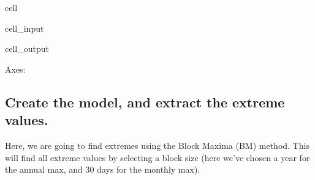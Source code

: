 \documentclass[letterpaper,10pt,english]{jupyterBook}
\begin{document}
\begin{sphinxuseclass}{cell}
\begin{sphinxVerbatimInput}
\begin{sphinxuseclass}{cell_input}
\begin{sphinxVerbatim}[commandchars=\\\{\}]
  
  

    

 
\end{sphinxVerbatim}

\end{sphinxuseclass}\end{sphinxVerbatimInput}
\begin{sphinxVerbatimOutput}

\begin{sphinxuseclass}{cell_output}
\begin{sphinxVerbatim}[commandchars=\\\{\}]
\PYGZlt{}Axes: \PYGZgt{}
\end{sphinxVerbatim}

\noindent{}

\end{sphinxuseclass}\end{sphinxVerbatimOutput}

\end{sphinxuseclass}

\subsection{Create the model, and extract the extreme values.}
\label{\detokenize{notebooks/regional_and_local/SL_Extremes_annual:create-the-model-and-extract-the-extreme-values}}
\sphinxAtStartPar
Here, we are going to find extremes using the Block Maxima (BM) method. This will find all extreme values by selecting a block size (here we’ve chosen a year for the annual max, and 30 days for the monthly max).
\end{document}
